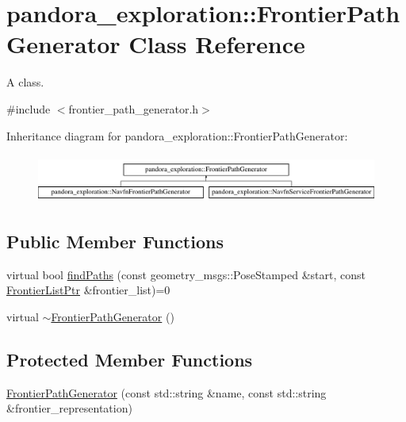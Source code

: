 \hypertarget{classpandora__exploration_1_1_frontier_path_generator}{\section{pandora\-\_\-exploration\-:\-:\-Frontier\-Path\-Generator \-Class \-Reference}
\label{classpandora__exploration_1_1_frontier_path_generator}
}


\-A class.  




{\ttfamily \#include $<$frontier\-\_\-path\-\_\-generator.\-h$>$}

\-Inheritance diagram for pandora\-\_\-exploration\-:\-:\-Frontier\-Path\-Generator\-:\begin{figure}[H]
\begin{center}
\leavevmode
\includegraphics[height=1.613833cm]{classpandora__exploration_1_1_frontier_path_generator}
\end{center}
\end{figure}
\subsection*{\-Public \-Member \-Functions}
\begin{DoxyCompactItemize}
\item 
virtual bool \hyperlink{classpandora__exploration_1_1_frontier_path_generator_aa924645e9008eaf4776bbf044fd89c3e}{find\-Paths} (const geometry\-\_\-msgs\-::\-Pose\-Stamped \&start, const \hyperlink{namespacepandora__exploration_a6f3b1959fca391e2ef3ac46b6e96be7a}{\-Frontier\-List\-Ptr} \&frontier\-\_\-list)=0
\item 
virtual \hyperlink{classpandora__exploration_1_1_frontier_path_generator_a8af170ae3fc8c8c094c23ec807d02104}{$\sim$\-Frontier\-Path\-Generator} ()
\end{DoxyCompactItemize}
\subsection*{\-Protected \-Member \-Functions}
\begin{DoxyCompactItemize}
\item 
\hyperlink{classpandora__exploration_1_1_frontier_path_generator_ac993f0ad6acdeb5c93a8a5ccde704ed1}{\-Frontier\-Path\-Generator} (const std\-::string \&name, const std\-::string \&frontier\-\_\-representation)
\end{DoxyCompactItemize}
